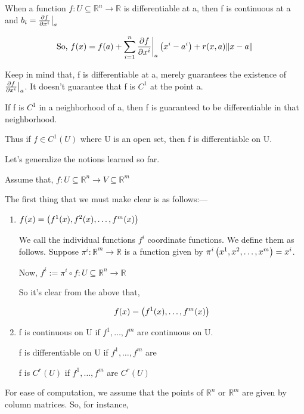 When a function $ f: U \subseteq \mathbb{R}^n \longrightarrow \mathbb{R}$ is differentiable at a, then f is continuous at a and $ b_i = \frac{\partial f}{\partial x^i} \big|_a$

\begin{align*}
    & \text{So, } f(x) = f(a) + \sum_{i=1}^{n} \frac{\partial f}{\partial x^i} \bigg|_a \left(  x^i - a^i \right) + r(x,a) \| x-a \| \\
\end{align*}

Keep in mind that, f is differentiable at a, merely guarantees the existence of $ \frac{\partial f}{\partial x^i} \big|_a$. It doesn't guarantee that f is $ C^1$ at the point a.

If f is $ C^1$ in a neighborhood of a, then f is guaranteed to be differentiable in that neighborhood.

Thus if $ f \in C^1(U)$ where U is an open set, then f is differentiable on U.

Let's generalize the notions learned so far.

Assume that, $ f: U \subseteq \mathbb{R}^n \longrightarrow V \subseteq \mathbb{R}^m$

The first thing that we must make clear is as follows:—

\begin{enumerate}
    \item $ f(x) = \left(  f^1(x), f^2(x), \ldots, f^m(x) \right)$

    We call the individual functions $ f^i$ coordinate functions. We define them as follows. Suppose $ \pi^i : \mathbb{R}^m \longrightarrow \mathbb{R}$ is a function given by $ \pi^i \left(  x^1, x^2, \ldots, x^m \right) = x^i$.

    Now, $ f^i := \pi^i \circ f : U \subseteq \mathbb{R}^n \longrightarrow \mathbb{R}$

    So it's clear from the above that,

    \begin{align*}
        & f(x) = \left(  f^1(x), \ldots, f^m(x) \right) \\
    \end{align*}

    \item f is continuous on U if $ f^1, \ldots, f^m$ are continuous on U.

    f is differentiable on U if $ f^1, \ldots, f^m$ are

    f is $ C^r(U)$ if $ f^1, \ldots, f^m$ are $ C^r(U)$
\end{enumerate}

For ease of computation, we assume that the points of $ \mathbb{R}^n$ or $ \mathbb{R}^m$ are given by column matrices. So, for instance,

